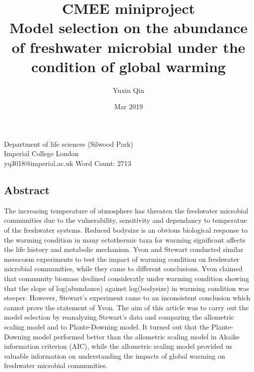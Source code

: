 \documentclass[11pt]{article}
\title{
CMEE miniproject \\
\textbf{ Model selection on the abundance of freshwater microbial under the condition of global warming}}
\author{Yuxin Qin }
\date{Mar 2019}
\begin{document}
\maketitle

\begin{center}
Department of life sciences (Silwood Park)\\
Imperial College London  \\
\bigbreak
yq3018@imperial.ac.uk
\bigbreak
\bigbreak
\bigbreak
\bigbreak
\bigbreak
\bigbreak
Word Count: 2713
\end{center}


\newpage
\begin{linenumbers}
\section*{Abstract}
The increasing temperature of atmosphere has threaten the freshwater microbial communities due to the vulnerability, sensitivity and dependancy to temperatue of the freshwater systems.
Reduced bodysize is an obvious biological response to the warming condition in many ectothermic taxa for warming significant affects the life history and metabolic mechanism.
Yvon and Stewart conducted similar mesocosm experiments to test the impact of warming condition on freshwater microbial communities, while they came to different conclusions.
Yvon claimed that community biomass declined consideratly under warming condition showing that the slope of log(abundance) against log(bodysize) in warming condition was steeper.
However, Stewart's experiment came to an inconsistent conclusion which cannot prove the statement of Yvon.
The aim of this article was to carry out the model selection by reanalyzing Stewart's data and comparing the allometric scaling model and to Plante-Downing model.
It turned out that the Plante-Downing model performed better than the allometric scaling model in Akaike information criterion (AIC), while the allometric scaling model provided us valuable information on understanding the impacts of global warming on freshwater microbial communities.



\end{linenumbers}
\end{document}
